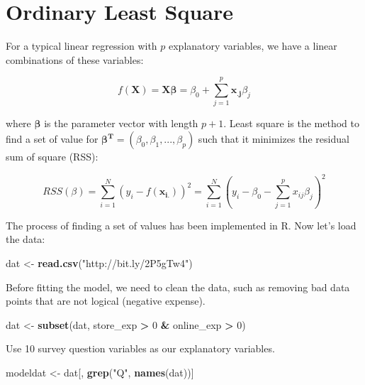 \documentclass[12pt,]{krantz}
\makeatletter
\newenvironment{Shaded}{\begin{snugshade}}{\end{snugshade}}
\newcommand{\DecValTok}[1]{\textcolor[rgb]{0.06,0.06,0.06}{#1}}
\newcommand{\KeywordTok}[1]{\textcolor[rgb]{0.27,0.27,0.27}{\textbf{#1}}}
\newcommand{\NormalTok}[1]{#1}
\newcommand{\OperatorTok}[1]{\textcolor[rgb]{0.43,0.43,0.43}{\textbf{#1}}}
\newcommand{\StringTok}[1]{\textcolor[rgb]{0.5,0.5,0.5}{#1}}
\newenvironment{kframe}{%
\medskip{}
\setlength{\fboxsep}{.8em}
 \def\at@end@of@kframe{}%
 \ifinner\ifhmode%
  \def\at@end@of@kframe{\end{minipage}}%
  \begin{minipage}{\columnwidth}%
 \fi\fi%
 \def\FrameCommand##1{\hskip\@totalleftmargin \hskip-\fboxsep
 \colorbox{shadecolor}{##1}\hskip-\fboxsep
     \hskip-\linewidth \hskip-\@totalleftmargin \hskip\columnwidth}%
 \MakeFramed {\advance\hsize-\width
   \@totalleftmargin\z@ \linewidth\hsize
   \@setminipage}}%
 {\par\unskip\endMakeFramed%
 \at@end@of@kframe}
\renewenvironment{Shaded}{\begin{kframe}}{\end{kframe}}
\makeatother
\begin{document}
\hypertarget{ordinary-least-square}{%
\section{Ordinary Least Square}\label{ordinary-least-square}}

For a typical linear regression with \(p\) explanatory variables, we have a linear combinations of these variables:

\[f(\mathbf{X})=\mathbf{X}\mathbf{\beta}=\beta_{0}+\sum_{j=1}^{p}\mathbf{x_{.j}}\beta_{j}\]

where \(\mathbf{\beta}\) is the parameter vector with length \(p+1\). Least square is the method to find a set of value for \(\mathbf{\beta^{T}}=(\beta_{0},\beta_{1},...,\beta_{p})\) such that it minimizes the residual sum of square (RSS):

\[RSS(\beta)=\sum_{i=1}^{N}(y_{i}-f(\mathbf{x_{i.}}))^{2}=\sum_{i=1}^{N}(y_{i}-\beta_{0}-\sum_{j=1}^{p}x_{ij}\beta_{j})^{2}\]

The process of finding a set of values has been implemented in R. Now let's load the data:

\begin{Shaded}
\begin{Highlighting}[]
\NormalTok{dat <-}\StringTok{ }\KeywordTok{read.csv}\NormalTok{(}\StringTok{"http://bit.ly/2P5gTw4"}\NormalTok{)}
\end{Highlighting}
\end{Shaded}

Before fitting the model, we need to clean the data, such as removing bad data points that are not logical (negative expense).

\begin{Shaded}
\begin{Highlighting}[]
\NormalTok{dat <-}\StringTok{ }\KeywordTok{subset}\NormalTok{(dat, store_exp }\OperatorTok{>}\StringTok{ }\DecValTok{0} \OperatorTok{&}\StringTok{ }\NormalTok{online_exp }\OperatorTok{>}\StringTok{ }\DecValTok{0}\NormalTok{)}
\end{Highlighting}
\end{Shaded}

Use 10 survey question variables as our explanatory variables.

\begin{Shaded}
\begin{Highlighting}[]
\NormalTok{modeldat <-}\StringTok{ }\NormalTok{dat[, }\KeywordTok{grep}\NormalTok{(}\StringTok{"Q"}\NormalTok{, }\KeywordTok{names}\NormalTok{(dat))]}
\end{Highlighting}
\end{Shaded}
\end{document}

